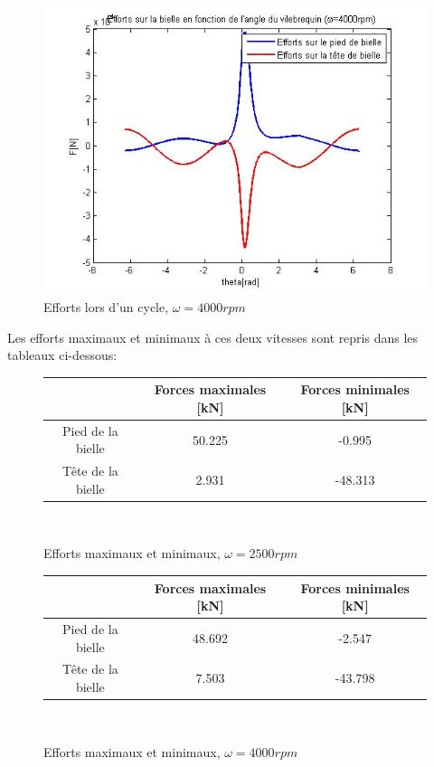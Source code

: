 \documentclass[a4paper,oneside,12pt]{report}
\begin{document}
\begin{figure}[H]
\center
\includegraphics[scale=0.7]{effort_4000rpm.jpg}
\caption{Efforts lors d'un cycle, $\omega=4000rpm$}
\end{figure}

Les efforts maximaux et minimaux à ces deux vitesses sont repris dans les tableaux ci-dessous: \\

\begin{figure}
\begin{center}
\begin{tabular}{|c||c|c|}
\hline 
\ & Forces maximales [kN] & Forces minimales [kN] \\ 
\hline 
Pied de la bielle & 50.225 & -0.995 \\ 
\hline 
Tête de la bielle & 2.931 & -48.313 \\ 
\hline 
\end{tabular} \\
\end{center}
\caption{Efforts maximaux et minimaux, $\omega=2500rpm$}
\end{figure}

\begin{figure}
\begin{center}
\begin{tabular}{|c||c|c|}
\hline 
\ & Forces maximales [kN] & Forces minimales [kN] \\ 
\hline 
Pied de la bielle & 48.692 & -2.547 \\ 
\hline 
Tête de la bielle &  7.503 & -43.798 \\ 
\hline 
\end{tabular} \\
\caption{Efforts maximaux et minimaux, $\omega=4000rpm$}
\end{center}
\end{figure}
\end{document}
